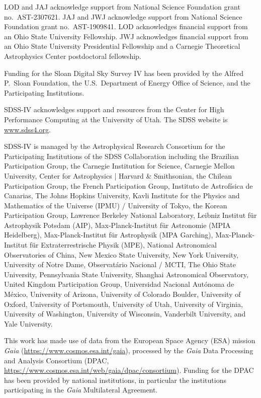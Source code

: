 \documentclass[twocolumn,twocolappendix,linenumbers]{aastex631}
\begin{document}
LOD and JAJ acknowledge support from National Science Foundation grant no.\ AST-2307621. JAJ and JWJ acknowledge support from National Science Foundation grant no.\ AST-1909841.
LOD acknowledges financial support from an Ohio State University Fellowship.
JWJ acknowledges financial support from an Ohio State University Presidential Fellowship and a Carnegie Theoretical Astrophysics Center postdoctoral fellowship.

Funding for the Sloan Digital Sky 
Survey IV has been provided by the 
Alfred P.\ Sloan Foundation, the U.S.\ 
Department of Energy Office of 
Science, and the Participating 
Institutions. 

SDSS-IV acknowledges support and 
resources from the Center for High 
Performance Computing  at the 
University of Utah. The SDSS 
website is \url{www.sdss4.org}.

SDSS-IV is managed by the 
Astrophysical Research Consortium 
for the Participating Institutions 
of the SDSS Collaboration including 
the Brazilian Participation Group, 
the Carnegie Institution for Science, 
Carnegie Mellon University, Center for 
Astrophysics | Harvard \& 
Smithsonian, the Chilean Participation 
Group, the French Participation Group, 
Instituto de Astrof\'isica de 
Canarias, The Johns Hopkins 
University, Kavli Institute for the 
Physics and Mathematics of the 
Universe (IPMU) / University of 
Tokyo, the Korean Participation Group, 
Lawrence Berkeley National Laboratory, 
Leibniz Institut f\"ur Astrophysik 
Potsdam (AIP),  Max-Planck-Institut 
f\"ur Astronomie (MPIA Heidelberg), 
Max-Planck-Institut f\"ur 
Astrophysik (MPA Garching), 
Max-Planck-Institut f\"ur 
Extraterrestrische Physik (MPE), 
National Astronomical Observatories of 
China, New Mexico State University, 
New York University, University of 
Notre Dame, Observat\'ario 
Nacional / MCTI, The Ohio State 
University, Pennsylvania State 
University, Shanghai 
Astronomical Observatory, United 
Kingdom Participation Group, 
Universidad Nacional Aut\'onoma 
de M\'exico, University of Arizona, 
University of Colorado Boulder, 
University of Oxford, University of 
Portsmouth, University of Utah, 
University of Virginia, University 
of Washington, University of 
Wisconsin, Vanderbilt University, 
and Yale University.

This work has made use of data from the European Space Agency (ESA) mission
{\it Gaia} (\url{https://www.cosmos.esa.int/gaia}), processed by the {\it Gaia}
Data Processing and Analysis Consortium (DPAC,
\url{https://www.cosmos.esa.int/web/gaia/dpac/consortium}). Funding for the DPAC
has been provided by national institutions, in particular the institutions
participating in the {\it Gaia} Multilateral Agreement.
\end{document}
